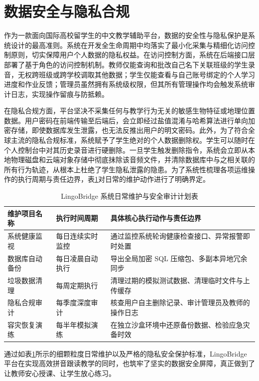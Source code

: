 \section{数据安全与隐私合规}

作为一款面向国际高校留学生的中文教学辅助平台，数据的安全性与隐私保护是系统设计的最高准则。系统在开发全生命周期中均落实了最小化采集与精细化访问控制原则，切实保障用户个人数据的隐私权益。在访问控制方面，系统在后端接口层部署了基于角色的访问控制机制。教师仅能查询和批改自己名下关联班级的学生录音，无权跨班级或跨学校调取其他数据；学生仅能查看与自己账号绑定的个人学习进度和作业反馈；管理员虽然拥有系统级权限，但其所有管理操作均会触发系统审计日志，实现操作留痕与防抵赖。

在隐私合规方面，平台坚决不采集任何与教学行为无关的敏感生物特征或地理位置数据。用户密码在前端传输至后端后，会立即经过盐值混淆与哈希算法进行单向加密存储，即使数据库发生泄露，也无法反推出用户的明文密码。此外，为了符合全球主流的隐私合规标准，系统赋予了学生绝对的个人数据删除权。学生可以随时在个人控制台中对其历史录音进行硬删除。一旦学生触发删除指令，系统会立即从本地物理磁盘和云端对象存储中彻底抹除该音频文件，并清除数据库中与之相关联的所有行为轨迹，从根本上杜绝了学生隐私泄露的隐患。为了系统性梳理各项运维操作的执行周期与责任边界，表\ref{tab:maintenance_schedule}对日常的维护动作进行了明确界定。

\begin{table}[htbp]
  \centering
  \caption{LingoBridge 系统日常维护与安全审计计划表}
  \label{tab:maintenance_schedule}
  \begin{tabularx}{\textwidth}{lXX}
    \toprule
    维护项目名称 & 执行时间周期 & 具体核心执行动作与责任边界 \\
    \midrule
    系统健康监视 & 每日连续实时监控 & 通过监控系统轮询健康检查接口、异常报警即时处置 \\
    数据库自动备份 & 每日凌晨自动执行 & 导出全局加密 SQL 压缩包、多副本异地冗余同步 \\
    垃圾数据清理 & 每周定期执行 & 清理过期的模拟测试数据、清理临时文件与上传缓存 \\
    隐私合规审计 & 每季度深度审计 & 核查用户自主删除记录、审计管理员及教师的操作日志 \\
    容灾恢复演练 & 每半年模拟演练 & 在独立沙盒环境中还原备份数据、检验应急灾备时效 \\
    \bottomrule
  \end{tabularx}
\end{table}

通过如表\ref{tab:maintenance_schedule}所示的细颗粒度日常维护以及严格的隐私安全保护标准，LingoBridge 平台在实现高效拼音跟读教学的同时，也筑牢了坚实的数据安全屏障，真正做到了让教师安心授课、让学生放心练习。
